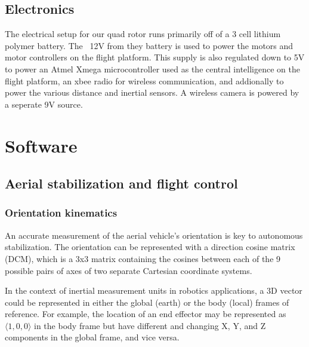 \documentclass[12pt,letterpaper]{article}
\begin{document}
\subsection*{Electronics}

The electrical setup for our quad rotor runs primarily off of a 3 cell
lithium polymer battery. The ~12V from they battery is used to power the motors
and motor controllers on the flight platform. This supply is also regulated down
to 5V to power an Atmel Xmega microcontroller used as the central intelligence
on the flight platform, an xbee radio for wireless communication, and
addionally to power the various distance and inertial sensors. A wireless camera
is powered by a seperate 9V source.


\section*{Software}

\subsection*{Aerial stabilization and flight control}


\subsubsection*{Orientation kinematics}

An accurate measurement of the aerial vehicle's orientation is key to
autonomous stabilization. The orientation can be represented with a direction
cosine matrix (DCM), which is a 3x3 matrix containing the cosines between each
of the 9 possible pairs of axes of two separate Cartesian coordinate systems.

In the context of inertial measurement units in robotics applications, a 3D
vector could be represented in either the global (earth) or the body (local)
frames of reference. For example, the location of an end effector may be
represented as $\langle1, 0, 0\rangle$ in the body frame but have different and changing
X, Y, and Z components in the global frame, and vice versa.
\end{document}
